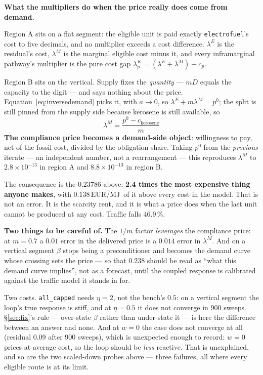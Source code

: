 \documentclass[11pt,a4paper]{article}
\newcommand{\var}[1]{\texttt{\small #1}}
\newcommand{\EURMJ}{\ensuremath{\mathrm{EUR}/\mathrm{MJ}}}
\begin{document}
\begin{keybox}
\textbf{What the multipliers do when the price really does come from demand.}

\medskip
Region A sits on a flat segment: the eligible unit is paid exactly \var{electrofuel}'s
cost to five decimals, and no multiplier exceeds a cost difference. $\lambda^{E}$ is the
residual's cost, $\lambda^{M}$ is the marginal eligible cost minus it, and every
inframarginal pathway's multiplier is the pure cost gap
$\lambda^{K}_{p} = (\lambda^{E}+\lambda^{M}) - c_{p}$.

\medskip
Region B sits on the vertical. Supply fixes the \emph{quantity} --- $mD$ equals the
capacity to the digit --- and says nothing about the price.
Equation~\eqref{eq:inversedemand} picks it, with $a \to 0$, so $\lambda^{E} + m\lambda^{M}
= p^{0}$; the split is still pinned from the supply side because kerosene is still
available, so
\[
  \boxed{\;\lambda^{M} = \frac{p^{0} - c_{\mathrm{kerosene}}}{m}\;}
\]
\textbf{The compliance price becomes a demand-side object}: willingness to pay, net of the
fossil cost, divided by the obligation share. Taking $p^{0}$ from the \emph{previous}
iterate --- an independent number, not a rearrangement --- this reproduces $\lambda^{M}$ to
$2.8\times10^{-13}$ in region A and $8.8\times10^{-13}$ in region B.

\medskip
The consequence is the $0.23786$ above: \textbf{2.4 times the most expensive thing anyone
makes}, with $0.138$\,\EURMJ\ of it above every cost in the model. That is not an error.
It is the scarcity rent, and it is what a price does when the last unit cannot be produced
at any cost. Traffic falls 46.9\,\%.

\medskip
\textbf{Two things to be careful of.} The $1/m$ factor \emph{leverages} the compliance
price: at $m=0.7$ a $0.01$ error in the delivered price is a $0.014$ error in
$\lambda^{M}$. And on a vertical segment $\beta$ stops being a preconditioner and becomes
the demand curve whose crossing sets the price --- so that $0.238$ should be read as
``what this demand curve implies'', not as a forecast, until the coupled response is
calibrated against the traffic model it stands in for.
\end{keybox}

\noindent Two costs. \var{all\_capped} needs $\eta = 2$, not the bench's $0.5$: on a
vertical segment the loop's true response is stiff, and at $\eta=0.5$ it does not converge
in 900 sweeps. \S\ref{sec:fix}'s rule --- over-state $\beta$ rather than under-state it ---
is here the difference between an answer and none. And at $w=0$ the case does not converge
at all (residual 0.09 after 900 sweeps), which is unexpected enough to record: $w=0$ prices
at average cost, so the loop should be \emph{less} reactive. That is unexplained, and so
are the two scaled-down probes above --- three failures, all where every eligible route is
at its limit.
\end{document}
